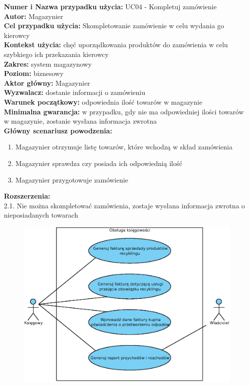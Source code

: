 \textbf{Numer i Nazwa przypadku użycia:} UC04 - Kompletuj zamówienie \\
\textbf{Autor:} Magazynier\\
\textbf{Cel przypadku użycia:} Skompletowanie zamówienie w celu wydania go kierowcy \\
\textbf{Kontekst użycia:} chęć uporządkowania produktów do zamówienia w celu szybkiego ich przekazania kierowcy \\
\textbf{Zakres:} system magazynowy \\
\textbf{Poziom:} biznesowy \\
\textbf{Aktor główny:} Magazynier \\
\textbf{Wyzwalacz:} dostanie informacji o zamówieniu \\
\textbf{Warunek początkowy:} odpowiednia ilość towarów w magazynie \\
\textbf{Minimalna gwarancja:} w przypadku, gdy nie ma odpowiedniej ilości towarów w magazynie, zostanie wysłana informacja zwrotna  \\
\textbf{Główny scenariusz powodzenia:} 
	\begin{enumerate}
		\item Magazynier otrzymuje listę towarów, które wchodzą w skład zamówienia
		\item Magazynier sprawdza czy posiada ich odpowiednią ilość
		\item Magazynier przygotowuje zamówienie
	\end{enumerate}
\textbf{Rozszerzenia:} \\
2.1. Nie można skompletować zamówienia, zostaje wysłana informacja zwrotna o nieposiadanych towarach\\

\begin{figure}[H]
	\centering
	\includegraphics[width=.8\textwidth]{img/UC/ksiegowosc.eps}
\end{figure}

